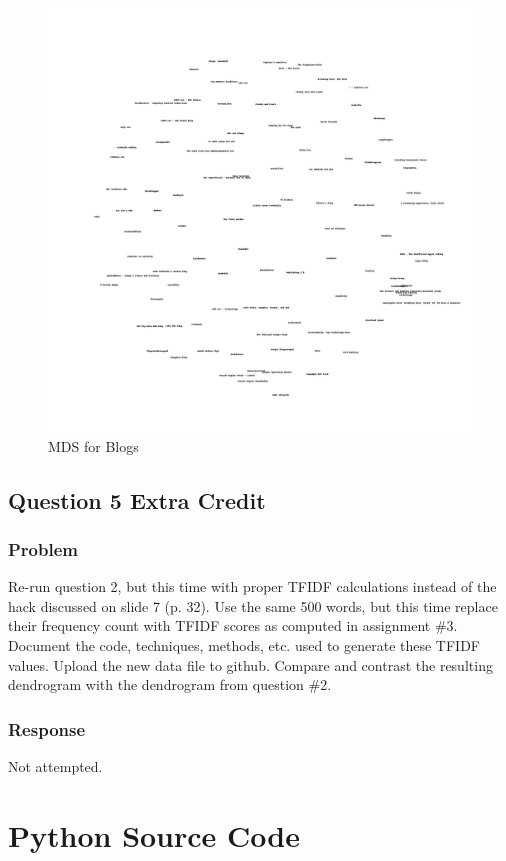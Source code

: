 \documentclass[letterpaper,11pt]{report}
\begin{document}
\begin{savenotes}
\begin{figure}[htbp]
	\centering
		\includegraphics[width=1.00\textwidth]{blogs2d.jpg}
	\caption{MDS for Blogs}
	\label{fig:blogs2d}
\end{figure}

\section{Question 5 Extra Credit}
\subsection{Problem}Re-run question 2, but this time with proper TFIDF calculations instead of the hack discussed on slide 7 (p. 32).  Use the same 500 words, but this time replace their frequency count with TFIDF scores as computed in assignment \#3.  Document the code, techniques, methods, etc. used to generate these TFIDF values.  Upload the new data file to github. Compare and contrast the resulting dendrogram with the dendrogram from question \#2.
\subsection{Response}Not attempted.

\end{savenotes}




\appendix
{}

\chapter{Python Source Code} \label{chap:python}


\end{document}
